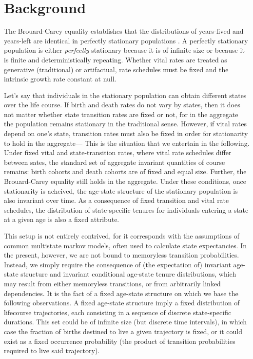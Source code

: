 \documentclass[12pt,oneside,a4paper]{article}
\theoremstyle{definition}
\begin{document}
\section{Background}
The Brouard-Carey equality establishes that the distributions of years-lived and years-left are identical in perfectly
stationary populations
\citep{brouard1989mouvements,Vaupel2009,rao2014,villavicencioRiffeSymmetires2016}.
A perfectly stationary population is either \emph{perfectly} stationary because it is
of infinite size or because it is finite and
deterministically repeating. Whether vital rates are treated as generative (traditional) or artifactual, rate schedules must be fixed and the intrinsic growth rate
constant at null.

Let's say that individuals in
the stationary population can obtain different states over the life course. If
birth and death rates do not vary by states, then it does not matter whether
state transition rates are fixed or not, for in the aggregate the population remains
stationary in the traditional sense. However, if vital rates depend on one's
state, transition rates must also be fixed in order for stationarity to
hold in the aggregate--- This is the situation that we entertain in the
following. Under fixed vital and state-transition rates, where vital rate
schedules differ between sates, the standard set of aggregate invariant
quantities of course remains:
birth cohorts and death cohorts are of fixed and equal size. Further, the
Brouard-Carey equality still holds in the aggregate. Under these conditions,
once stationarity is acheived, the age-state structure of the stationary
population is also invariant over time. As a consequence of fixed transition
and vital rate schedules, the distribution of state-specific tenures for
individuals entering a state at a given age is also a fixed attribute.

This setup is not entirely contrived, for it corresponds with the assumptions of
common multistate markov models, often used to calculate state expectancies.
In the present, however, we are not bound to memoryless transition probabilities.
Instead, we simply require the consequence of (the expectation of) invariant
age-state structure and invariant conditional age-state tenure distributions, which may result from
either memoryless transitions, or from arbitrarily linked
dependencies.
It is the fact of a fixed age-state structure on which we base the following observations.
A fixed age-state structure imply a fixed distribution of lifecourse
trajectories, each consisting in a sequence of discrete state-specific
durations. This set could be of infinite size (but discrete time intervals), in
which case the fraction of births destined to live a given trajectory is fixed,
or it could exist as a fixed occurrence probability (the product of
transition probabilities required to live said trajectory). 
\end{document}
